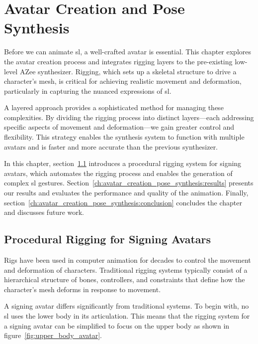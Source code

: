 \documentclass[../../main.tex]{subfiles}
\begin{document}
\chapter{Avatar Creation and Pose Synthesis}
\label{ch:avatar_creation_pose_synthesis}

Before we can animate \gls{sl}, a well-crafted avatar is essential. This chapter explores the avatar creation process and integrates rigging layers to the pre-existing low-level AZee synthesizer. Rigging, which sets up a skeletal structure to drive a character's mesh, is critical for achieving realistic movement and deformation, particularly in capturing the nuanced expressions of \gls{sl}.

A layered approach provides a sophisticated method for managing these complexities. By dividing the rigging process into distinct layers—each addressing specific aspects of movement and deformation—we gain greater control and flexibility. This strategy enables the synthesis system to function with multiple avatars and is faster and more accurate than the previous synthesizer.

In this chapter, section~\ref{ch:avatar_creation_pose_synthesis:proc_rig_signing_avatars} introduces a procedural rigging system for signing avatars, which automates the rigging process and enables the generation of complex \gls{sl} gestures. Section~\ref{ch:avatar_creation_pose_synthesis:results} presents our results and evaluates the performance and quality of the animation. Finally, section~\ref{ch:avatar_creation_pose_synthesis:conclusion} concludes the chapter and discusses future work.

\section{Procedural Rigging for Signing Avatars}
\label{ch:avatar_creation_pose_synthesis:proc_rig_signing_avatars}

Rigs have been used in computer animation for decades to control the movement and deformation of characters. Traditional rigging systems typically consist of a hierarchical structure of bones, controllers, and constraints that define how the character’s mesh deforms in response to movement.

A signing avatar differs significantly from traditional systems. To begin with, no \gls{sl} uses the lower body in its articulation. This means that the rigging system for a signing avatar can be simplified to focus on the upper body as shown in figure~\ref{fig:upper_body_avatar}. 
\end{document}
